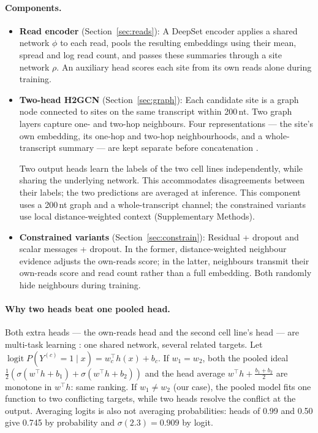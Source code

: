 \documentclass[11pt,a4paper]{article}
\begin{document}
\paragraph{Components.}
\begin{itemize}
    \item \textbf{Read encoder} (Section~\ref{sec:reads}): A DeepSet encoder
    applies a shared network $\phi$ to each read, pools the resulting
    embeddings using their mean, spread and log read count, and passes these
    summaries through a site network $\rho$. An auxiliary head scores each
    site from its own reads alone during training.

    \item \textbf{Two-head H2GCN} (Section~\ref{sec:graph}): Each candidate
    site is a graph node connected to sites on the same transcript within
    200\,nt. Two graph layers capture one- and two-hop neighbours. Four
    representations --- the site's own embedding, its one-hop and two-hop
    neighbourhoods, and a whole-transcript summary --- are kept separate
    before concatenation \citep{xu2018}.

    Two output heads learn the labels of the two cell lines independently,
    while sharing the underlying network. This accommodates disagreements
    between their labels; the two predictions are averaged at
    inference. This component uses a 200\,nt graph and a whole-transcript channel;
    the constrained variants use local distance-weighted context
    (Supplementary Methods).

    \item \textbf{Constrained variants} (Section~\ref{sec:constrain}):
    Residual + dropout and scalar messages + dropout. In the former,
    distance-weighted neighbour evidence adjusts the own-reads score; in the
    latter, neighbours transmit their own-reads score and read count rather
    than a full embedding. Both randomly hide neighbours during training.
\end{itemize}

\paragraph{Why two heads beat one pooled head.}
\label{app:twohead}
Both extra heads --- the own-reads head and the second cell line's head ---
are multi-task learning \citep{caruana1997}: one shared network, several
related targets.
Let $\operatorname{logit}P(Y^{(c)}=1\mid x)=w_c^\top h(x)+b_c$. If
$w_1=w_2$, both the pooled ideal
$\tfrac12(\sigma(w^\top h+b_1)+\sigma(w^\top h+b_2))$ and the head average
$w^\top h+\tfrac{b_1+b_2}{2}$ are monotone in $w^\top h$: same ranking. If
$w_1\neq w_2$ (our case), the pooled model fits one function to two
conflicting targets, while two heads resolve the conflict at the output.
Averaging logits is also not averaging probabilities: heads of 0.99 and 0.50
give 0.745 by probability and $\sigma(2.3)=0.909$ by logit.
\end{document}
